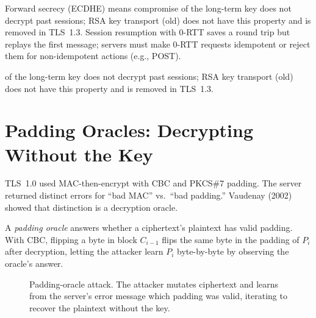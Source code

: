 Forward secrecy (ECDHE) means compromise of the long-term key does not decrypt past sessions; RSA key transport (old) does not have this property and is removed in TLS~1.3. Session resumption with 0-RTT saves a round trip but replays the first message; servers must make 0-RTT requests idempotent or reject them for non-idempotent actions (e.g., POST).

 of the long-term key does not decrypt past sessions; RSA key transport (old) does not have this property and is removed in TLS~1.3.

\section{Padding Oracles: Decrypting Without the Key}
\label{sec:padding-oracle}
TLS~1.0 used MAC-then-encrypt with CBC and PKCS\#7 padding. The server returned distinct errors for ``bad MAC'' vs.\ ``bad padding.'' Vaudenay (2002) showed that distinction is a decryption oracle.

\begin{definition}
A \emph{padding oracle} answers whether a ciphertext's plaintext has valid padding. With CBC, flipping a byte in block $C_{i-1}$ flips the same byte in the padding of $P_i$ after decryption, letting the attacker learn $P_i$ byte-by-byte by observing the oracle's answer.
\end{definition}

\begin{figure}[h]\centering
{}
\caption{Padding-oracle attack. The attacker mutates ciphertext and learns from the server's error message which padding was valid, iterating to recover the plaintext without the key.}
\label{fig:padding-oracle}
\end{figure}

